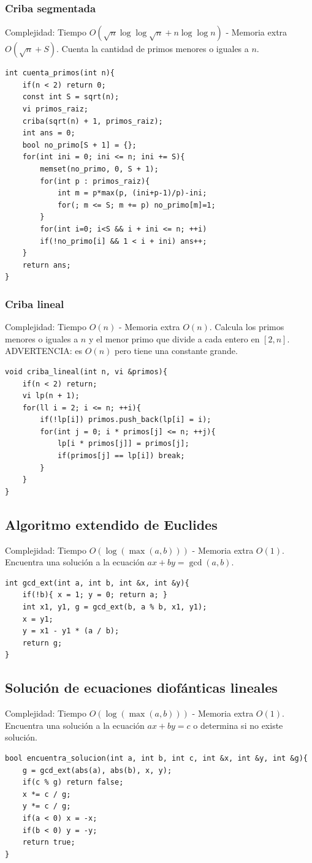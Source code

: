 \documentclass[12 pts,spanish,mexico]{article}
\numberwithin{equation}{section}
\begin{document}
\begin{multicols}{2}
\subsubsection{Criba segmentada}
Complejidad: Tiempo $O(\sqrt{n}\log \log \sqrt{n} + n\log \log n)$ - Memoria extra $O(\sqrt{n} + S)$. Cuenta la cantidad de primos menores o iguales a $n$.
\begin{verbatim}
int cuenta_primos(int n){
    if(n < 2) return 0;
    const int S = sqrt(n);
    vi primos_raiz;
    criba(sqrt(n) + 1, primos_raiz);
    int ans = 0;
    bool no_primo[S + 1] = {};
    for(int ini = 0; ini <= n; ini += S){
        memset(no_primo, 0, S + 1);
        for(int p : primos_raiz){
            int m = p*max(p, (ini+p-1)/p)-ini;
            for(; m <= S; m += p) no_primo[m]=1;
        }
        for(int i=0; i<S && i + ini <= n; ++i)
        if(!no_primo[i] && 1 < i + ini) ans++;
    }
    return ans;
}
\end{verbatim}

\subsubsection{Criba lineal}
Complejidad: Tiempo $O(n)$ - Memoria extra $O(n)$. Calcula los primos menores o iguales a $n$ y el menor primo que divide a cada entero en $[2, n]$. ADVERTENCIA: es $O(n)$ pero tiene una constante grande.
\begin{verbatim}
void criba_lineal(int n, vi &primos){
    if(n < 2) return;
    vi lp(n + 1);
    for(ll i = 2; i <= n; ++i){
        if(!lp[i]) primos.push_back(lp[i] = i);
        for(int j = 0; i * primos[j] <= n; ++j){
            lp[i * primos[j]] = primos[j];
            if(primos[j] == lp[i]) break;
        }
    }
}
\end{verbatim}

\subsection{Algoritmo extendido de Euclides}
Complejidad: Tiempo $O(\log (\max(a, b)))$ - Memoria extra $O(1)$. Encuentra una solución a la ecuación $ax + by = \gcd(a, b)$.
\begin{verbatim}
int gcd_ext(int a, int b, int &x, int &y){
    if(!b){ x = 1; y = 0; return a; }
    int x1, y1, g = gcd_ext(b, a % b, x1, y1);
    x = y1;
    y = x1 - y1 * (a / b);
    return g;
}
\end{verbatim}

\subsection{Solución de ecuaciones diofánticas lineales}
Complejidad: Tiempo $O(\log (\max(a, b)))$ - Memoria extra $O(1)$. Encuentra una solución a la ecuación $ax + by = c$ o determina si no existe solución.
\begin{verbatim}
bool encuentra_solucion(int a, int b, int c, int &x, int &y, int &g){
    g = gcd_ext(abs(a), abs(b), x, y);
    if(c % g) return false;
    x *= c / g;
    y *= c / g;
    if(a < 0) x = -x;
    if(b < 0) y = -y;
    return true;
}
\end{verbatim}


\end{multicols}
\end{document}

